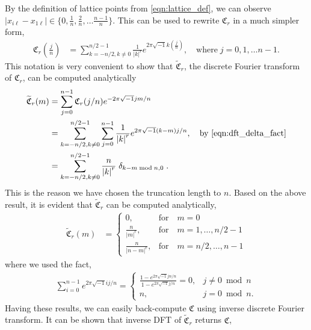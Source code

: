 \documentclass{iitthesis}          %
\def\abs#1{\ensuremath{\left \lvert #1 \right \rvert}}
\begin{document}
By the definition of lattice points from \eqref{eqn:lattice_def}, we can observe
$\abs{x_{i\ell}-x_{1\ell}} \in \lbrace 0, \frac 1n, \frac 2n, \dots \frac{n-1}{n}  \rbrace$. This can be used to rewrite $\mathfrak{C}_r$ in a much simpler form,
\begin{align*}
\mathfrak{C}_r \left(\frac jn \right) &= \sum_{k = - n/2, k \neq 0 }^{n/2 - 1} \frac{1}{\abs{k}^r} 
e^{ 2 \pi\sqrt{-1} k (\frac jn)}, \quad \text{where} \;  j=0,1,\dots n-1.
\end{align*}
This notation is very convenient to show that $\widetilde{\mathfrak{C}}_r$,  the discrete Fourier transform of $\mathfrak{C}_r$, can be computed analytically
\begin{align*}
\widetilde{\mathfrak{C}}_r(m) &= \sum_{j=0}^{n-1} \mathfrak{C}_r (j/n) e^{- 2 \pi\sqrt{-1} jm/n} 
\\
&= \sum_{k = - n/2, k \neq 0 }^{n/2-1} 
\sum_{j=0}^{n-1} \frac{1}{\abs{k}^r} e^{ 2 \pi\sqrt{-1} (k-m)  j/n} , \quad \text{by \eqref{eqn:dft_delta_fact}}
\\
&= \sum_{k = - n/2, k \neq 0  }^{n/2-1} \frac{n}{\abs{k}^r} \; \delta_{k-m \bmod n, 0} \; .
\end{align*}
This is the reason we have chosen the truncation length to $n$. 
Based on the above result, it is evident that $\widetilde{\mathfrak{C}}_r$ can be computed analytically,
\begin{align} \label{dft_of_g}
\widetilde{\mathfrak{C}}_r(m) &= 
\begin{cases}
0, & \text{for} \quad m=0 \\
\frac{n}{\abs{m}^r}, & \text{for} \quad m=1,\dots,n/2-1 \\
\frac{n}{\abs{n-m}^r}, & \text{for} \quad m=n/2,\dots,n-1
\end{cases}
\end{align}
where we used the fact,
\begin{align}
\label{eqn:dft_delta_fact}
\sum_{i=0}^{n-1} e^{2 \pi \sqrt{-1} i j /n} = 
\begin{cases}
\frac{1 - e^{2\pi \sqrt{-1} j n /n}}{1 - e^{2\pi \sqrt{-1} j /n}} = 0, &j \ne 0 \bmod n
\\
n, & j = 0 \bmod n.
\end{cases}
\end{align}
Having these results, we can easily back-compute $\mathfrak{C}$ using inverse discrete Fourier transform. It can be shown that inverse DFT of $\widetilde{\mathfrak{C}}_{r}$ returns $\mathfrak{C}$,
\end{document}
